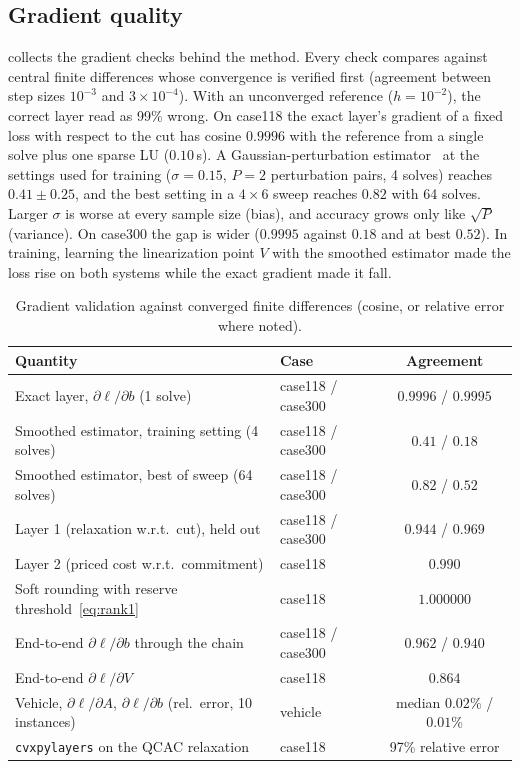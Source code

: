 \documentclass[10pt]{article}
\begin{document}
\subsection{Gradient quality}
\label{sec:gradients}
 collects the gradient checks behind the method. Every check compares against central finite differences whose convergence is verified first (agreement between step sizes $10^{-3}$ and $3\times10^{-4}$). With an unconverged reference ($h=10^{-2}$), the correct layer read as 99\% wrong. On case118 the exact layer's gradient of a fixed loss with respect to the cut has cosine $0.9996$ with the reference from a single solve plus one sparse LU ($0.10$\,s). A Gaussian-perturbation estimator~\citep{berthet2020perturbed} at the settings used for training ($\sigma=0.15$, $P=2$ perturbation pairs, 4 solves) reaches $0.41\pm0.25$, and the best setting in a $4\times6$ sweep reaches $0.82$ with 64 solves. Larger $\sigma$ is worse at every sample size (bias), and accuracy grows only like $\sqrt P$ (variance). On case300 the gap is wider ($0.9995$ against $0.18$ and at best $0.52$). In training, learning the linearization point $V$ with the smoothed estimator made the loss rise on both systems while the exact gradient made it fall.

\begin{table}[t]
\centering\small
\caption{Gradient validation against converged finite differences (cosine, or relative error where noted).}
\label{tab:grad}
\begin{tabular}{@{}llc@{}}
\toprule
Quantity & Case & Agreement \\
\midrule
Exact layer, $\partial\ell/\partial b$ (1 solve) & case118 / case300 & $0.9996$ / $0.9995$ \\
Smoothed estimator, training setting (4 solves) & case118 / case300 & $0.41$ / $0.18$ \\
Smoothed estimator, best of sweep (64 solves) & case118 / case300 & $0.82$ / $0.52$ \\
Layer 1 (relaxation w.r.t.\ cut), held out & case118 / case300 & $0.944$ / $0.969$ \\
Layer 2 (priced cost w.r.t.\ commitment) & case118 & $0.990$ \\
Soft rounding with reserve threshold~\eqref{eq:rank1} & case118 & $1.000000$ \\
End-to-end $\partial\ell/\partial b$ through the chain & case118 / case300 & $0.962$ / $0.940$ \\
End-to-end $\partial\ell/\partial V$ & case118 & $0.864$ \\
Vehicle, $\partial\ell/\partial A$, $\partial\ell/\partial b$ (rel.\ error, 10 instances) & vehicle & median $0.02\%$ / $0.01\%$ \\
\texttt{cvxpylayers} on the QCAC relaxation & case118 & 97\% relative error \\
\bottomrule
\end{tabular}
\end{table}
\end{document}
